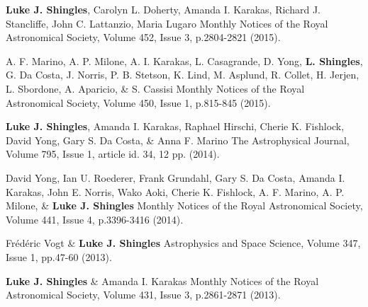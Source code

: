 \documentclass[11pt]{article} %
\newcommand{\highlight}[1]{\textbf{#1}}
\begin{document}
\begin{itemize-noindent}
{\highlight{Luke J. Shingles}, Carolyn L. Doherty, Amanda I. Karakas, Richard J. Stancliffe, John C. Lattanzio, Maria Lugaro}
{Monthly Notices of the Royal Astronomical Society, Volume 452, Issue 3, p.2804-2821 (2015).}

{A. F. Marino, A. P. Milone, A. I. Karakas, L. Casagrande, D. Yong, \highlight{L. Shingles}, G. Da Costa, J. Norris, P. B. Stetson,  K. Lind, M. Asplund, R. Collet, H. Jerjen, L. Sbordone, A. Aparicio, \& S. Cassisi}
{Monthly Notices of the Royal Astronomical Society, Volume 450, Issue 1, p.815-845 (2015).}

{\highlight{Luke J. Shingles}, Amanda I. Karakas, Raphael Hirschi, Cherie K. Fishlock, David Yong, Gary S. Da Costa, \& Anna F. Marino}
{The Astrophysical Journal, Volume 795, Issue 1, article id. 34, 12 pp. (2014).}

{David Yong, Ian U. Roederer, Frank Grundahl, Gary S. Da Costa, Amanda I. Karakas, John E. Norris, Wako Aoki, Cherie K. Fishlock, A. F. Marino, A. P. Milone, \& \highlight{Luke J. Shingles}}
{Monthly Notices of the Royal Astronomical Society, Volume 441, Issue 4, p.3396-3416 (2014).}

{Fr\'{e}d\'{e}ric Vogt \& \highlight{Luke J. Shingles}}
{Astrophysics and Space Science, Volume 347, Issue 1, pp.47-60 (2013).}

{\highlight{Luke J. Shingles} \& Amanda I. Karakas}
{Monthly Notices of the Royal Astronomical Society, Volume 431, Issue 3, p.2861-2871 (2013).}

\end{itemize-noindent}
\end{document}
